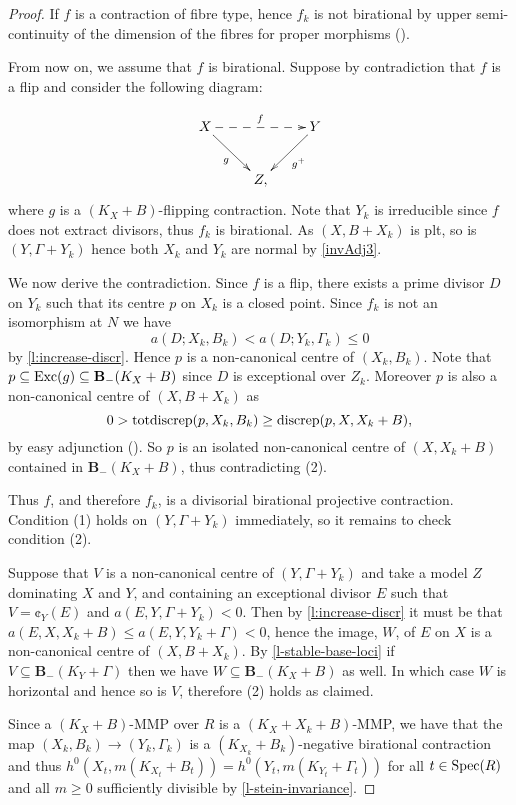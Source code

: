 \begin{proof}
	If $f$ is a contraction of fibre type, hence $f_k$ is not birational by upper semi-continuity of the dimension of the fibres for proper morphisms (\cite[\href{https://stacks.math.columbia.edu/tag/0D4Q}{Tag 0D4Q}]{stacks-project}). 
	
	From now on, we assume that $f$ is birational. Suppose by contradiction that $f$ is a flip and consider the following diagram:
	
	\begin{equation*}
	\xymatrix{
		X \ar@{->}_{g}[rd] \ar@{-->}^{f}[rr]
		&
		& Y \ar@{->}^{g^+}[ld]\\
		&Z,}
	\end{equation*} 
	where $g$ is a $(K_X+B)$-flipping contraction.
	Note that $Y_k$ is irreducible since $f$ does not extract divisors, thus $f_k$ is birational. As $(X,B+X_k)$ is plt, so is $(Y,\Gamma+Y_k)$ hence both $X_k$ and $Y_k$ are normal by \autoref{invAdj3}. 
	
	We now derive the contradiction. Since $f$ is a flip, there exists a prime divisor $D$ on $Y_k$ such that its centre $p$ on $X_k$ is a closed point.
	Since $f_k$ is not an isomorphism at $N$ we have
	$$a(D;X_k,B_k)<a(D;Y_k,\Gamma_k)\leq 0$$
	by \autoref{l:increase-discr}.
	Hence $p$ is a non-canonical centre of $(X_{k},B_k)$. Note that $p \subseteq \textup{Exc}(g) \subseteq \mathbf{B}_{-}(K_{X}+B)$ since $D$ is exceptional over $Z_k$. 
	Moreover $p$ is also a non-canonical centre of $(X,B+X_{k})$ as $$0 > \textup{totdiscrep}(p, X_k, B_k) \geq \textup{discrep}(p, X, X_k+B), $$ by easy adjunction (\cite[Theorem 17.2]{FA}).
	So $p$ is an isolated non-canonical centre of $(X,X_k+B)$ contained in $\mathbf{B}_{-}(K_{X}+B)$, thus contradicting (2).
	
	Thus $f$, and therefore $f_k$, is a divisorial birational projective contraction. Condition (1) holds on $(Y,\Gamma+Y_k)$ immediately, so it remains to check condition (2).
	
	Suppose that $V$ is a non-canonical centre of $(Y,\Gamma+Y_{k})$ and take a model $Z$ dominating $X$ and $Y$, and containing an exceptional divisor $E$ such that $V=\cent_Y(E)$ and $a(E, Y, \Gamma+Y_{k}) <0$. Then by \autoref{l:increase-discr} it must be that $a(E,X,X_k+B) \leq a(E,Y,Y_{k}+\Gamma) < 0$, hence the image, $W$, of $E$ on $X$ is a non-canonical centre of $(X,B+X_{k})$. By \autoref{l-stable-base-loci} if $V \subseteq \mathbf{B}_{-}(K_{Y}+\Gamma)$ then we have $W \subseteq \mathbf{B}_{-}(K_{X}+B)$ as well. In which case $W$ is horizontal and hence so is $V$, therefore (2) holds as claimed.
	
	Since a $(K_X+B)$-MMP over $R$ is a $(K_X+X_k+B)$-MMP, we have that the map $(X_k,B_k) \rightarrow (Y_k, \Gamma_k)$ is a $(K_{X_k}+B_k)$-negative birational contraction and thus $h^0(X_t,m(K_{X_t}+B_t))=h^0(Y_t,m(K_{Y_t}+\Gamma_t))$ for all $t\in\operatorname{Spec} (R)$ and all $m\geq 0$ sufficiently divisible by \autoref{l-stein-invariance}.
\end{proof}


